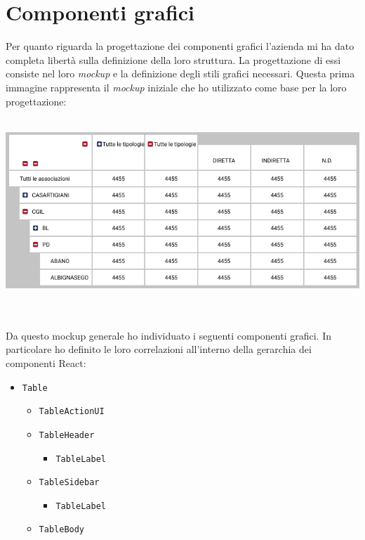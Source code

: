 \section{Componenti grafici}
Per quanto riguarda la progettazione dei componenti grafici l'azienda mi ha dato completa libertà sulla definizione della loro struttura. La progettazione di essi consiste nel loro \emph{mockup} e la definizione degli stili grafici necessari. Questa prima immagine rappresenta il \emph{mockup} iniziale che ho utilizzato come base per la loro progettazione: 
\\
\\
\begin{minipage}{\linewidth}
\includegraphics[scale=0.55]{./immagini/mockup-generale.png}
\end{minipage}
\mbox{} 
\\
\\
Da questo mockup generale ho individuato i seguenti componenti grafici. In particolare ho definito le loro correlazioni all'interno della gerarchia dei componenti React:
\begin{itemize}
	\item \verb|Table|
	\begin{itemize}
		\item \verb|TableActionUI|
		\item \verb|TableHeader|
		\begin{itemize}
			\item \verb|TableLabel|
		\end{itemize}
		\item \verb|TableSidebar|
		\begin{itemize}
			\item \verb|TableLabel|
		\end{itemize}
		\item \verb|TableBody|
	\end{itemize}
\end{itemize}

